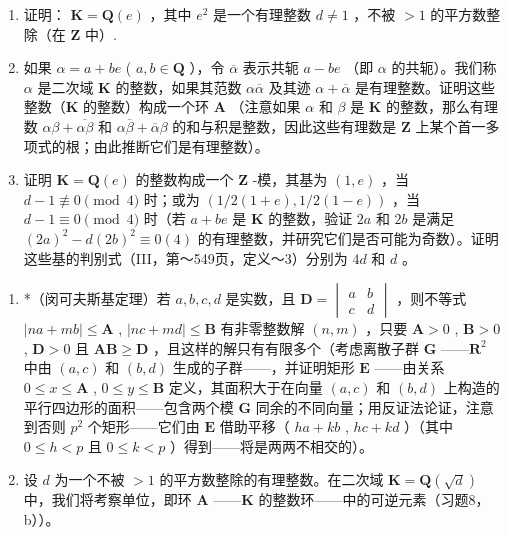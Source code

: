 \begin{enumerate}
\def\labelenumi{\alph{enumi})}
\item
  证明： \(\mathbf{K} = \mathbf{Q}(e)\) ，其中 \(e^2\) 是一个有理整数 \(d \neq 1\) ，不被 \(>1\) 的平方数整除（在 \(\mathbf{Z}\) 中）.
\item
  如果 \(\alpha = a + be\) ( \(a, b \in \mathbf{Q}\) ），令 \(\overline{\alpha}\) 表示共轭 \(a - be\) （即 \(\alpha\) 的共轭）。我们称 \(\alpha\) 是二次域 \(\mathbf{K}\) 的整数，如果其范数 \(\alpha\overline{\alpha}\) 及其迹 \(\alpha + \overline{\alpha}\) 是有理整数。证明这些整数（\(\mathbf{K}\) 的整数）构成一个环 \(\mathbf{A}\) （注意如果 \(\alpha\) 和 \(\beta\) 是 \(\mathbf{K}\) 的整数，那么有理数 \(\alpha\beta + \overline{\alpha\beta}\) 和 \(\alpha\overline{\beta} + \overline{\alpha}\beta\) 的和与积是整数，因此这些有理数是 \(\mathbf{Z}\) 上某个首一多项式的根；由此推断它们是有理整数）。
\item
  证明 \(\mathbf{K} = \mathbf{Q}(e)\) 的整数构成一个 \(\mathbf{Z}\) -模，其基为 \((1, e)\) ，当 \(d - 1 \not\equiv 0 \pmod{4}\) 时；或为 \((1/2(1 + e), 1/2(1 - e))\) ，当 \(d - 1 \equiv 0 \pmod{4}\) 时（若 \(a + be\) 是 \(\mathbf{K}\) 的整数，验证 \(2a\) 和 \(2b\) 是满足 \((2a)^2 - d(2b)^2 \equiv 0(4)\) 的有理整数，并研究它们是否可能为奇数）。证明这些基的判别式（III，第～549页，定义～3）分别为 \(4d\) 和 \(d\) 。
\end{enumerate}

\begin{enumerate}
\def\labelenumi{\arabic{enumi})}
\setcounter{enumi}{8}
\item
  *（闵可夫斯基定理）若 \(a, b, c, d\) 是实数，且 \(\mathbf{D} = \begin{vmatrix} a & b \\ c & d \end{vmatrix}\) ，则不等式 \(|na + mb| \leqslant \mathbf{A}\) , \(|nc + md| \leqslant \mathbf{B}\) 有非零整数解 \((n, m)\) ，只要 \(\mathbf{A} > 0\) , \(\mathbf{B} > 0\) , \(\mathbf{D} > 0\) 且 \(\mathbf{AB} \geqslant \mathbf{D}\) ，且这样的解只有有限多个（考虑离散子群 \(\mathbf{G}\) ——\(\mathbf{R}^2\) 中由 \((a, c)\) 和 \((b, d)\) 生成的子群——，并证明矩形 \(\mathbf{E}\) ——由关系 \(0 \leqslant x \leqslant \mathbf{A}\) , \(0 \leqslant y \leqslant \mathbf{B}\) 定义，其面积大于在向量 \((a, c)\) 和 \((b, d)\) 上构造的平行四边形的面积——包含两个模 \(\mathbf{G}\) 同余的不同向量；用反证法论证，注意到否则 \(p^2\) 个矩形——它们由 \(\mathbf{E}\) 借助平移（ \(ha + kb\) , \(hc + kd\) ）（其中 \(0 \leqslant h < p\) 且 \(0 \leqslant k < p\) ）得到——将是两两不相交的）。
\item
  设 \(d\) 为一个不被 \(>1\) 的平方数整除的有理整数。在二次域 \(\mathbf{K} = \mathbf{Q}(\sqrt{d})\) 中，我们将考察单位，即环 \(\mathbf{A}\) ——\(\mathbf{K}\) 的整数环——中的可逆元素（习题8，b））。
\end{enumerate}

